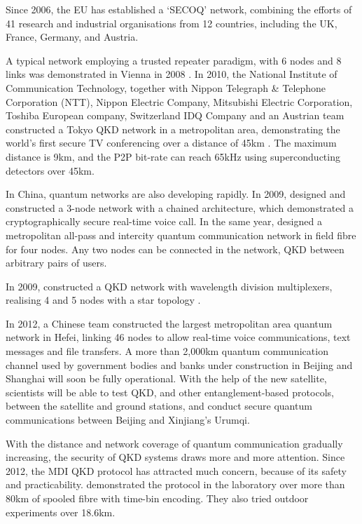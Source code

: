 Since 2006, the EU has established a `SECOQ' network, combining the efforts of 41 research and industrial organisations from 12 countries, including the UK, France, Germany, and Austria.

A typical network employing a trusted repeater paradigm, with 6 nodes and 8 links was demonstrated in Vienna in 2008 \cite{bib:NJP_11_075001}. In 2010, the National Institute of Communication Technology, together with Nippon Telegraph \& Telephone Corporation (NTT), Nippon Electric Company, Mitsubishi Electric Corporation, Toshiba European company, Switzerland IDQ Company and an Austrian team constructed a Tokyo QKD network in a metropolitan area, demonstrating the world's first secure TV conferencing over a distance of 45km \cite{bib:OExp_19_10387}. The maximum distance is 9km, and the P2P bit-rate can reach 65kHz using superconducting detectors over 45km. 

In China, quantum networks are also developing rapidly. In 2009, \cite{bib:OpEx17_6540} designed and constructed a 3-node network with a chained architecture, which demonstrated a cryptographically secure real-time voice call. In the same year, \cite{bib:OpEx_18_27217} designed a metropolitan all-pass and intercity quantum communication network in field fibre  for four nodes. Any two nodes can be connected in the network, QKD between arbitrary pairs of users.

In 2009, \cite{bib:PLA_372_3957} constructed a QKD network with wavelength division multiplexers, realising 4 and 5 nodes with a star topology \cite{bib:OL_35_2454}.

In 2012, a Chinese team constructed the largest metropolitan area quantum network in Hefei, linking 46 nodes to allow real-time voice communications, text messages and file transfers. A more than 2,000km quantum communication channel used by government bodies and banks under construction in Beijing and Shanghai will soon be fully operational. With the help of the new satellite, scientists will be able to test QKD, and other entanglement-based protocols, between the satellite and ground stations, and conduct secure quantum communications between Beijing and Xinjiang's Urumqi.

With the distance and network coverage of quantum communication gradually increasing, the security of QKD systems draws more and more attention. Since 2012, the MDI QKD protocol has attracted much concern, because of its safety and practicability. \cite{bib:PRL_111_130501} demonstrated the protocol in the laboratory over more than 80km of spooled fibre with time-bin encoding. They also tried outdoor experiments over 18.6km.

